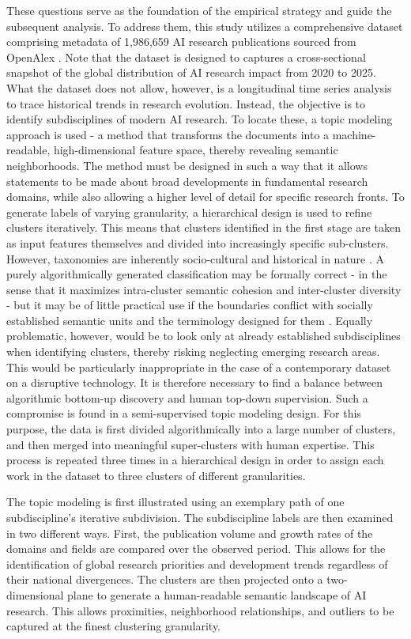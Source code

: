 \documentclass{article}
\begin{document}
	These questions serve as the foundation of the empirical strategy and guide the subsequent analysis. To address them, this study utilizes a comprehensive dataset comprising metadata of 1,986,659 AI research publications sourced from OpenAlex \cite{openalex2023}. Note that the dataset is designed to captures a cross-sectional snapshot of the global distribution of AI research impact from 2020 to 2025. What the dataset does not allow, however, is a longitudinal time series analysis to trace historical trends in research evolution. Instead, the objective is to identify subdisciplines of modern AI research. To locate these, a topic modeling approach is used - a method that transforms the documents into a machine-readable, high-dimensional feature space, thereby revealing semantic neighborhoods. The method must be designed in such a way that it allows statements to be made about broad developments in fundamental research domains, while also allowing a higher level of detail for specific research fronts. To generate labels of varying granularity, a hierarchical design is used to refine clusters iteratively. This means that clusters identified in the first stage are taken as input features themselves and divided into increasingly specific sub-clusters. However, taxonomies are inherently socio-cultural and historical in nature \cite{stichweh_1992_sociology_disciplines}. A purely algorithmically generated classification may be formally correct - in the sense that it maximizes intra-cluster semantic cohesion and inter-cluster diversity - but it may be of little practical use if the boundaries conflict with socially established semantic units and the terminology designed for them \cite{rafols_2025_multiple_ontologies}. Equally problematic, however, would be to look only at already established subdisciplines when identifying clusters, thereby risking neglecting emerging research areas. This would be particularly inappropriate in the case of a contemporary dataset on a disruptive technology. It is therefore necessary to find a balance between algorithmic bottom-up discovery and human top-down supervision. Such a compromise is found in a semi-supervised topic modeling design. For this purpose, the data is first divided algorithmically into a large number of clusters, and then merged into meaningful super-clusters with human expertise. This process is repeated three times in a hierarchical design in order to assign each work in the dataset to three clusters of different granularities.
	
	The topic modeling is first illustrated using an exemplary path of one subdiscipline's iterative subdivision. The subdiscipline labels are then examined  in two different ways. First, the publication volume and growth rates of the domains and fields are compared over the observed period. This allows for the identification of global research priorities and development trends regardless of their national divergences. The clusters are then projected onto a two-dimensional plane to generate a human-readable semantic landscape of AI research. This allows proximities, neighborhood relationships, and outliers to be captured at the finest clustering granularity.
	
\end{document}
